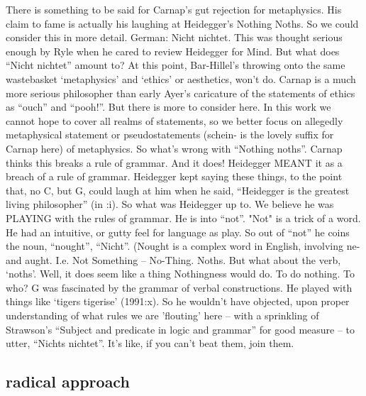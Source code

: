\documentclass[10pt,titlepage]{book}
\begin{document}
{There is something to be said for Carnap's gut rejection for metaphysics.
His claim to fame is actually his laughing at Heidegger's Nothing Noths.
So we could consider this in more detail.
German:  Nicht nichtet.
This was thought serious enough by Ryle when he cared to review Heidegger for Mind.
But what does ``Nicht nichtet'' amount to?
At this point, Bar-Hillel's throwing onto the same wastebasket `metaphysics' and `ethics' or aesthetics, won't do.
Carnap is a much more serious philosopher than early Ayer's caricature of the statements of ethics as ``ouch'' and ``pooh!''.
But there is more to consider here.
In this work we cannot hope to cover all realms of statements, so we better focus on allegedly metaphysical statement or pseudostatements (schein- is the lovely suffix for Carnap here) of metaphysics.
So what's wrong with ``Nothing noths''.
Carnap thinks this breaks a rule of grammar.
And it does!
Heidegger MEANT it as a breach of a rule of grammar.
Heidegger kept saying these things, to the point that, no C, but G, could laugh at him when he said, ``Heidegger is the greatest living philosopher'' (in \cite{grice89}:i).
So what was Heidegger up to.
We believe he was PLAYING with the rules of grammar.
He is into ``not''.
"Not" is a trick of a word.
He had an intuitive, or gutty feel for language as play.
So out of ``not'' he coins the noun, ``nought'', ``Nicht''.
(Nought is a complex word in English, involving ne- and aught.
I.e. Not Something -- No-Thing.
Noths.
But what about the verb, `noths'.
Well, it does  seem like a thing Nothingness would do.
To do nothing.
To who?
G was fascinated by the grammar of verbal constructions.
He played with things like `tigers  tigerise' (1991:x).
So he wouldn't have objected, upon proper understanding of what rules we are 'flouting' here -- with a sprinkling of Strawson's ``Subject and predicate in logic and grammar'' 
for good measure -- to utter, ``Nichts nichtet''.
It's like, if you can't beat them, join them.
 
\subsection{radical approach}

}
\end{document}

